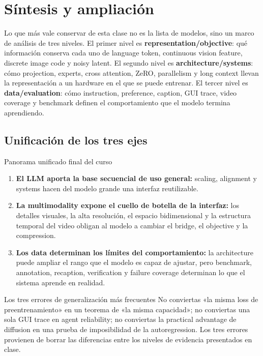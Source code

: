 \section{Síntesis y ampliación}

Lo que más vale conservar de esta clase no es la lista de modelos, sino un marco de análisis de tres niveles. El primer nivel es \textbf{representation/objective}: qué información conserva cada uno de language token, continuous vision feature, discrete image code y noisy latent. El segundo nivel es \textbf{architecture/systems}: cómo projection, experts, cross attention, ZeRO, parallelism y long context llevan la representación a un hardware en el que se puede entrenar. El tercer nivel es \textbf{data/evaluation}: cómo instruction, preference, caption, GUI trace, video coverage y benchmark definen el comportamiento que el modelo termina aprendiendo.

\subsection{Unificación de los tres ejes}

\begin{importantbox}{Panorama unificado final del curso}
\begin{enumerate}
  \item \textbf{El LLM aporta la base secuencial de uso general: }scaling, alignment y systems hacen del modelo grande una interfaz reutilizable.
  \item \textbf{La multimodality expone el cuello de botella de la interfaz: }los detalles visuales, la alta resolución, el espacio bidimensional y la estructura temporal del video obligan al modelo a cambiar el bridge, el objective y la compression.
  \item \textbf{Los data determinan los límites del comportamiento: }la architecture puede ampliar el rango que el modelo es capaz de ajustar, pero benchmark, annotation, recaption, verification y failure coverage determinan lo que el sistema aprende en realidad.
\end{enumerate}
\end{importantbox}

\begin{warningbox}{Los tres errores de generalización más frecuentes}
No conviertas «la misma loss de preentrenamiento» en un teorema de «la misma capacidad»; no conviertas una sola GUI trace en agent reliability; no conviertas la practical advantage de diffusion en una prueba de imposibilidad de la autoregression. Los tres errores provienen de borrar las diferencias entre los niveles de evidencia presentados en clase.
\end{warningbox}

